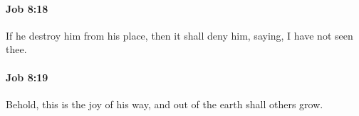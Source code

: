 		\paragraph{Job 8:18} %
			\label{JOB-8-18}

			If he destroy him from his place, then it shall deny him, saying, I have not seen thee.


		\paragraph{Job 8:19} %
			\label{JOB-8-19}

			Behold, this is the joy of his way, and out of the earth shall others grow.


